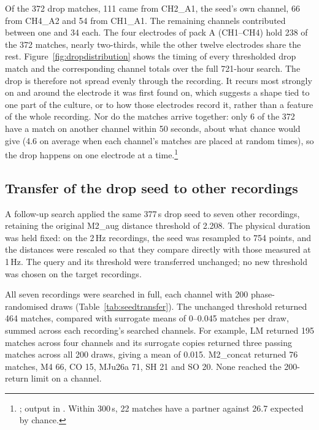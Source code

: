 Of the 372 drop matches, 111 came from CH2\_A1, the seed's own channel, 66 from CH4\_A2 and 54 from CH1\_A1. The remaining channels contributed between one and 34 each. The four electrodes of pack A (CH1--CH4) hold 238 of the 372 matches, nearly two-thirds, while the other twelve electrodes share the rest. Figure~\ref{fig:dropdistribution} shows the timing of every thresholded drop match and the corresponding channel totals over the full 721-hour search. The drop is therefore not spread evenly through the recording. It recurs most strongly on and around the electrode it was first found on, which suggests a shape tied to one part of the culture, or to how those electrodes record it, rather than a feature of the whole recording. Nor do the matches arrive together: only 6 of the 372 have a match on another channel within 50 seconds, about what chance would give (4.6 on average when each channel's matches are placed at random times), so the drop happens on one electrode at a time.\footnote{; output in . Within 300\,s, 22 matches have a partner against 26.7 expected by chance.}


\subsection{Transfer of the drop seed to other recordings}
\label{sec:seedtransfer}

A follow-up search applied the same 377\,s drop seed to seven other recordings, retaining the original M2\_aug distance threshold of 2.208. The physical duration was held fixed: on the 2\,Hz recordings, the seed was resampled to 754 points, and the distances were rescaled so that they compare directly with those measured at 1\,Hz. The query and its threshold were transferred unchanged; no new threshold was chosen on the target recordings.

All seven recordings were searched in full, each channel with 200 phase-randomised draws (Table~\ref{tab:seedtransfer}). The unchanged threshold returned 464 matches, compared with surrogate means of 0--0.045 matches per draw, summed across each recording's searched channels. For example, LM returned 195 matches across four channels and its surrogate copies returned three passing matches across all 200 draws, giving a mean of 0.015. M2\_concat returned 76 matches, M4 66, CO 15, MJu26a 71, SH 21 and SO 20. None reached the 200-return limit on a channel.

